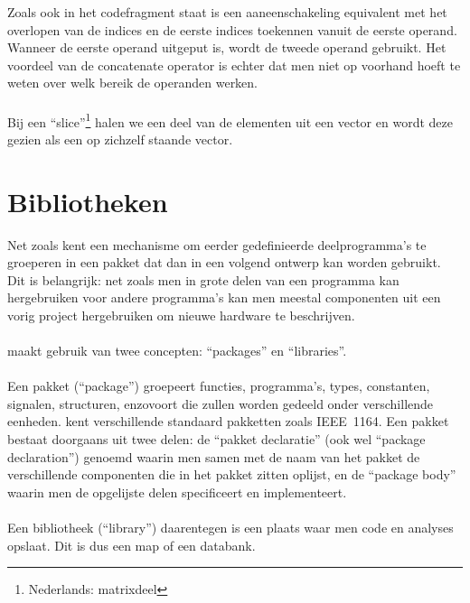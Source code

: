 Zoals ook in het codefragment staat is een aaneenschakeling equivalent met het overlopen van de indices en de eerste indices toekennen vanuit de eerste operand. Wanneer de eerste operand uitgeput is, wordt de tweede operand gebruikt. Het voordeel van de concatenate operator is echter dat men niet op voorhand hoeft te weten over welk bereik de operanden werken.

\paragraph{}
Bij een ``slice''\footnote{Nederlands: matrixdeel} halen we een deel van de elementen uit een vector en wordt deze gezien als een op zichzelf staande vector.


\section{Bibliotheken}
Net zoals \tjava{} kent \tvhdl{} een mechanisme om eerder gedefinieerde deelprogramma's te groeperen in een pakket dat dan in een volgend ontwerp kan worden gebruikt. Dit is belangrijk: net zoals men in \tjava{} grote delen van een programma kan hergebruiken voor andere programma's kan men meestal componenten uit een vorig project hergebruiken om nieuwe hardware te beschrijven.

\paragraph{}
\tvhdl{} maakt gebruik van twee concepten: ``packages'' en ``libraries''.

\paragraph{}
Een pakket (``package'') groepeert functies, programma's, types, constanten, signalen, structuren, enzovoort die zullen worden gedeeld onder verschillende eenheden. \tvhdl{} kent verschillende standaard pakketten zoals IEEE~1164. Een pakket bestaat doorgaans uit twee delen: de ``pakket declaratie'' (ook wel ``package declaration'') genoemd waarin men samen met de naam van het pakket de verschillende componenten die in het pakket zitten oplijst, en de ``package body'' waarin men de opgelijste delen specificeert en implementeert.

\paragraph{}
Een bibliotheek (``library'') daarentegen is een plaats waar men code en analyses opslaat. Dit is dus een map of een databank.

